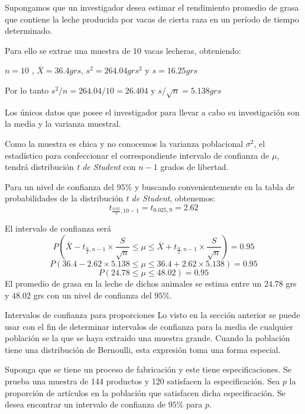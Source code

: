 \documentclass[
  10pt,
  ignorenonframetext,
]{beamer}
\begin{document}
\begin{frame}{}
\protect\hypertarget{section-15}{}
Supongamos que un investigador desea estimar el rendimiento promedio de
grasa que contiene la leche producida por vacas de cierta raza en un
período de tiempo determinado.

Para ello se extrae una muestra de 10 vacas lecheras, obteniendo:

\(n=10\) , \(\bar{X}=36.4 grs\), \(s^2=264.04 grs^2\) y \(s=16.25 grs\)

Por lo tanto \(s^2 /n = 264.04/10=26.404\) y \(s/\sqrt{n}=5.138 grs\)

Los únicos datos que posee el investigador para llevar a cabo su
investigación son la media y la varianza muestral.

Como la muestra es chica y no conocemos la varianza poblacional
\(\sigma^2\), el estadístico para confeccionar el correspondiente
intervalo de confianza de \(\mu\), tendrá distribución \emph{t de
Student} con \(n-1\) grados de libertad.
\end{frame}

\begin{frame}{}
\protect\hypertarget{section-16}{}
Para un nivel de confianza del \(95\%\) y buscando convenientemente en
la tabla de probabilidades de la distribución \emph{t de Student},
obtenemos:\[t_{\frac{0.05}{2},10-1}=t_{0.025,9}=2.62\]

El intervalo de confianza será
\[ P\left(\bar{X} - t_{\frac{\alpha}{2},n-1} \times \frac{S}{\sqrt{n}}  \le \mu \le \bar{X} + t_{\frac{\alpha}{2},n-1} \times \frac{S}{\sqrt{n}} \right)=0.95 \]
\[ P\left(36.4 - 2.62 \times 5.138  \le \mu \le 36.4 + 2.62 \times 5.138 \right)=0.95 \]
\[ P\left(24.78  \le \mu \le 48.02 \right)=0.95 \] El promedio de grasa
en la leche de dichos animales se estima entre un \(24.78\) grs y
\(48.02\) grs con un nivel de confianza del \(95\%\).
\end{frame}

\begin{frame}{Intervalos de confianza para proporciones}
\protect\hypertarget{intervalos-de-confianza-para-proporciones}{}
Lo visto en la sección anterior se puede usar con el fin de determinar
intervalos de confianza para la media de cualquier población se la que
se haya extraido una muestra grande. Cuando la población tiene una
distribución de Bernoulli, esta expresión toma una forma especial.

Suponga que se tiene un proceso de fabricación y este tiene
especificaciones. Se prueba una muestra de 144 productos y 120
satisfacen la especificación. Sea \(p\) la proporción de artículos en la
población que satisfacen dicha especificación. Se desea encontrar un
intervalo de confianza de \(95\%\) para \(p\).
\end{frame}
\end{document}
